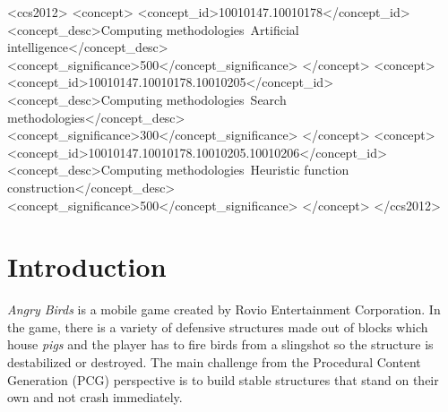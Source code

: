 \documentclass[sigconf]{acmart}
\begin{document}
 \begin{CCSXML}
<ccs2012>
<concept>
<concept_id>10010147.10010178</concept_id>
<concept_desc>Computing methodologies~Artificial intelligence</concept_desc>
<concept_significance>500</concept_significance>
</concept>
<concept>
<concept_id>10010147.10010178.10010205</concept_id>
<concept_desc>Computing methodologies~Search methodologies</concept_desc>
<concept_significance>300</concept_significance>
</concept>
<concept>
<concept_id>10010147.10010178.10010205.10010206</concept_id>
<concept_desc>Computing methodologies~Heuristic function 
construction</concept_desc>
<concept_significance>500</concept_significance>
</concept>
</ccs2012>
\end{CCSXML}




\maketitle

%
%
\section{Introduction}
\label{sec:intro}

\textit{Angry Birds} is a mobile game created by Rovio 
Entertainment 
Corporation\cite{angry-birds}. %
In the game, there is a variety of defensive structures made out of
blocks which house {\em pigs} 
and the player has to fire birds from a slingshot
so the structure is destabilized or destroyed.
The main challenge from 
the Procedural Content Generation (PCG) perspective is to build stable
structures that 
stand on their own and not crash immediately.
\end{document}
